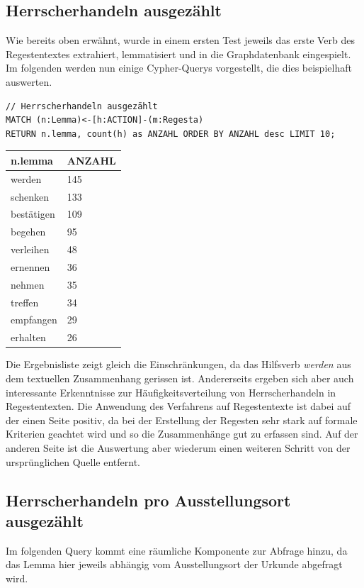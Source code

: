 \documentclass[ngerman,]{scrreprt}
\begin{document}
\hypertarget{herrscherhandeln-ausgezuxe4hlt}{%
\subsection{Herrscherhandeln ausgezählt}\label{herrscherhandeln-ausgezuxe4hlt}}

Wie bereits oben erwähnt, wurde in einem ersten Test jeweils das erste Verb des Regestentextes extrahiert, lemmatisiert und in die Graphdatenbank eingespielt. Im folgenden werden nun einige Cypher-Querys vorgestellt, die dies beispielhaft auswerten.

\begin{verbatim}
// Herrscherhandeln ausgezählt
MATCH (n:Lemma)<-[h:ACTION]-(m:Regesta)
RETURN n.lemma, count(h) as ANZAHL ORDER BY ANZAHL desc LIMIT 10;
\end{verbatim}

\begin{longtable}[]{@{}ll@{}}
\toprule
n.lemma & ANZAHL\tabularnewline
\midrule
\endhead
werden & 145\tabularnewline
schenken & 133\tabularnewline
bestätigen & 109\tabularnewline
begehen & 95\tabularnewline
verleihen & 48\tabularnewline
ernennen & 36\tabularnewline
nehmen & 35\tabularnewline
treffen & 34\tabularnewline
empfangen & 29\tabularnewline
erhalten & 26\tabularnewline
\bottomrule
\end{longtable}

Die Ergebnisliste zeigt gleich die Einschränkungen, da das Hilfsverb \emph{werden} aus dem textuellen Zusammenhang gerissen ist. Andererseits ergeben sich aber auch interessante Erkenntnisse zur Häufigkeitsverteilung von Herrscherhandeln in Regestentexten. Die Anwendung des Verfahrens auf Regestentexte ist dabei auf der einen Seite positiv, da bei der Erstellung der Regesten sehr stark auf formale Kriterien geachtet wird und so die Zusammenhänge gut zu erfassen sind. Auf der anderen Seite ist die Auswertung aber wiederum einen weiteren Schritt von der ursprünglichen Quelle entfernt.

\hypertarget{herrscherhandeln-pro-ausstellungsort-ausgezuxe4hlt}{%
\subsection{Herrscherhandeln pro Ausstellungsort ausgezählt}\label{herrscherhandeln-pro-ausstellungsort-ausgezuxe4hlt}}

Im folgenden Query kommt eine räumliche Komponente zur Abfrage hinzu, da das Lemma hier jeweils abhängig vom Ausstellungsort der Urkunde abgefragt wird.
\end{document}
